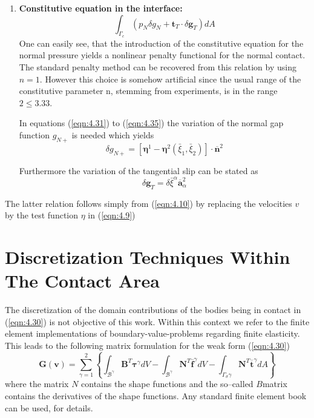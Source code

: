 \begin{enumerate}
\item \textbf{Constitutive equation in the interface:}
\begin{equation}
 \int_{\Gamma_{c}}\left(p_{N} \delta g_{N}+\mathbf{t}_{T} \cdot \delta \mathbf{g}_{T}\right) d A\label{eqn:4.35} 
\end{equation}
One can easily see, that the introduction of the constitutive equation for the normal pressure
yields a nonlinear penalty functional for the normal contact. The standard penalty method
can be recovered from this relation by using $n = 1$. However this choice is somehow
artificial since the usual range of the constitutive parameter n, stemming from experiments,
is in the range $2   \leq 3.33$.

In equations (\ref{eqn:4.31}) to (\ref{eqn:4.35}) the variation of the normal gap function $g_{N+}$ is needed which
yields
\begin{equation}
 \delta g_{N+}=\left[\boldsymbol{\eta}^{1}-\boldsymbol{\eta}^{2}\left(\bar{\xi}_{1}, \bar{\xi}_{2}\right)\right] \cdot \overline{\mathbf{n}}^{2} 
 \label{eqn:4.36} 
\end{equation}

Furthermore the variation of the tangential slip can be stated as
\begin{equation}
 \delta \mathbf{g}_{T}=\delta \bar{\xi}^{\alpha} \overline{\mathbf{a}}_{\alpha}^{2} 
\label{eqn:4.37} 
\end{equation}
\end{enumerate}

The latter relation follows simply from (\ref{eqn:4.10}) by replacing the velocities $v$ by the test
function $\eta$ in (\ref{eqn:4.9})

\section{Discretization Techniques Within The Contact Area}
The discretization of the domain contributions of the bodies being in contact in (\ref{eqn:4.30}) is not
objective of this work. Within this context we refer to the ﬁnite element implementations of
boundary-value-problems regarding ﬁnite elasticity. This leads to the following matrix formulation for the weak form (\ref{eqn:4.30})
\begin{equation}
 \mathbf{G}(\mathbf{v})=\sum_{\gamma=1}^{2}\left\{\int_{\mathcal{B}^{\gamma}} \mathbf{B}^{T} \boldsymbol{\tau}^{\gamma} d V-\int_{\mathcal{B}^{\gamma}} \mathbf{N}^{T} \overline{\mathbf{f}}^{\gamma} d V-\int_{\Gamma_{\sigma} \gamma} \mathbf{N}^{T} \overline{\mathbf{t}}^{\gamma} d A\right\} 
 \label{eqn:4.43}
\end{equation}
where the matrix $N$ contains the shape functions and the so–called $B$matrix contains
the derivatives of the shape functions. Any standard ﬁnite element book can be used, for
details.

